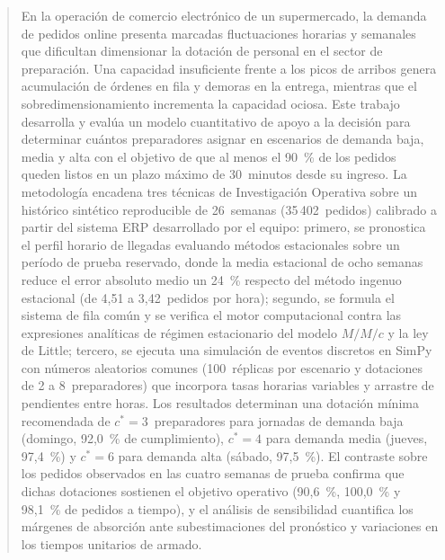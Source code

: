 \begin{abstract}
En la operación de comercio electrónico de un supermercado, la demanda de pedidos online presenta marcadas fluctuaciones horarias y semanales que dificultan dimensionar la dotación de personal en el sector de preparación.
Una capacidad insuficiente frente a los picos de arribos genera acumulación de órdenes en fila y demoras en la entrega, mientras que el sobredimensionamiento incrementa la capacidad ociosa.
Este trabajo desarrolla y evalúa un modelo cuantitativo de apoyo a la decisión para determinar cuántos preparadores asignar en escenarios de demanda baja, media y alta con el objetivo de que al menos el 90~\% de los pedidos queden listos en un plazo máximo de 30~minutos desde su ingreso.
La metodología encadena tres técnicas de Investigación Operativa sobre un histórico sintético reproducible de 26~semanas (35\,402~pedidos) calibrado a partir del sistema ERP desarrollado por el equipo: primero, se pronostica el perfil horario de llegadas evaluando métodos estacionales sobre un período de prueba reservado, donde la media estacional de ocho semanas reduce el error absoluto medio un 24~\% respecto del método ingenuo estacional (de 4,51 a 3,42~pedidos por hora); segundo, se formula el sistema de fila común y se verifica el motor computacional contra las expresiones analíticas de régimen estacionario del modelo $M/M/c$ y la ley de Little; tercero, se ejecuta una simulación de eventos discretos en SimPy con números aleatorios comunes (100~réplicas por escenario y dotaciones de 2 a 8~preparadores) que incorpora tasas horarias variables y arrastre de pendientes entre horas.
Los resultados determinan una dotación mínima recomendada de $c^* = 3$~preparadores para jornadas de demanda baja (domingo, 92,0~\% de cumplimiento), $c^* = 4$ para demanda media (jueves, 97,4~\%) y $c^* = 6$ para demanda alta (sábado, 97,5~\%).
El contraste sobre los pedidos observados en las cuatro semanas de prueba confirma que dichas dotaciones sostienen el objetivo operativo (90,6~\%, 100,0~\% y 98,1~\% de pedidos a tiempo), y el análisis de sensibilidad cuantifica los márgenes de absorción ante subestimaciones del pronóstico y variaciones en los tiempos unitarios de armado.
\end{abstract}
